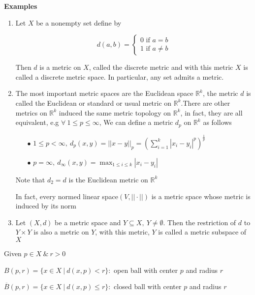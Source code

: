\textbf{Examples}

\begin{enumerate}
	\item Let $X$ be a nonempty set define by
	
	$$d(a,b) = \begin{cases}
		0 \text{ if } a = b\\ 1 \text{ if } a \neq b
	\end{cases}$$
	
	Then $d$ is a metric on $X$, called the discrete metric and with this metric $X$ is called a discrete metric space. In particular, any set admits a metric.
	\item The most important metric spaces are the Euclidean space $\mathbb R^k$, the metric $d$ is called the Euclidean or standard or usual metric on $\mathbb R^k$.There are other metrics on $\mathbb R^k$ induced the same metric topology on $\mathbb R^k$, in fact, they are all equivalent, e.g $\forall~ 1 \leq p \leq \infty$, We can define a metric $d_p$ on $\mathbb R^k$ as follows
		\begin{enumerate}
			\item[$\bullet$] $1 \leq p < \infty,~d_p(x,y) = ||x-y||_p = \left( \sum^k_{i=1}|x_i-y_i|^p\right)^{\frac{1}{p}}$
			\item[$\bullet$] $p = \infty,~d_{\infty}(x,y) = \max_{1 \leq i \leq k}|x_i - y_i|$
		\end{enumerate}
		
		Note that $d_2 = d$ is the Euclidean metric on $\mathbb R^k$
		
		\begin{rmk*}
			In fact, every normed linear space$(V,||\cdot||)$ is a metric space whose metric is induced by its norm
		\end{rmk*}
	\item Let $(X,d)$ be a metric space and $Y \subseteq X,~Y \neq \emptyset$. Then the restriction of $d$ to $Y \times Y$ is also a metric on $Y$, with this metric, $Y$ is called a metric subspace of $X$
	
\end{enumerate}

\newpage

\begin{defn}[ball]
	Given $p \in X ~\&~ r > 0$
	
	$B(p,r) = \{x \in X ~|~ d(x,p) < r\}:$ open ball with center $p$ and radius $r$
	
	$\overline{B}(p,r) = \{x \in X ~|~ d(x,p) \leq r\}:$ closed ball with center $p$ and radius $r$ 
\end{defn}

